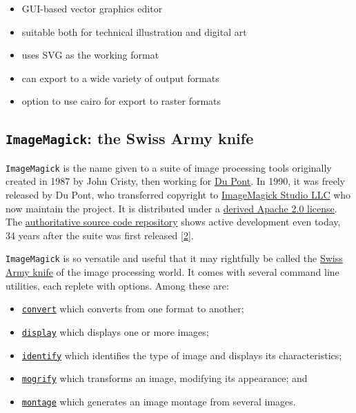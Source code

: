 \documentclass[
  12pt,
  british,
  a4paper,
  rgb,
  dvipsnames,
  svgnames,
  hyphens]{article}
\providecommand{\tightlist}{%
  \setlength{\itemsep}{0pt}\setlength{\parskip}{0pt}}
\begin{document}
\begin{enumerate}
  \begin{itemize}
  \tightlist
  \item
    GUI-based vector graphics editor
  \item
    suitable both for technical illustration and digital art
  \item
    uses SVG as the working format
  \item
    can export to a wide variety of output formats
  \item
    option to use cairo for export to raster formats
  \end{itemize}
\end{enumerate}

\hypertarget{imagemagick-the-swiss-army-knife}{%
\subsection{\texorpdfstring{\texttt{ImageMagick}: the Swiss Army
knife}{ImageMagick: the Swiss Army knife}}\label{imagemagick-the-swiss-army-knife}}

\texttt{ImageMagick} is the name given to a suite of image processing
tools originally created in 1987 by John Cristy, then working for
\href{https://www.dupont.com/}{Du Pont}. In 1990, it was freely released
by Du Pont, who transferred copyright to
\href{https://imagemagick.org/script/contact.php}{ImageMagick Studio
LLC} who now maintain the project. It is distributed under a
\href{https://imagemagick.org/script/license.php}{derived Apache 2.0
license}. The
\href{https://github.com/ImageMagick/ImageMagick}{authoritative source
code repository} shows active development even today, 34 years after the
suite was first released
\protect\hyperlink{ref-imagemagicksource}{{[}2{]}}.

\texttt{ImageMagick} is so versatile and useful that it may rightfully
be called the
\href{https://www.thefreedictionary.com/Swiss-army+knife}{Swiss Army
knife} of the image processing world. It comes with several command line
utilities, each replete with options. Among these are:

\begin{itemize}
\tightlist
\item
  \href{https://imagemagick.org/script/convert.php}{\texttt{convert}}
  which converts from one format to another;
\item
  \href{https://imagemagick.org/script/display.php}{\texttt{display}}
  which displays one or more images;
\item
  \href{https://imagemagick.org/script/identify.php}{\texttt{identify}}
  which identifies the type of image and displays its characteristics;
\item
  \href{https://imagemagick.org/script/mogrify.php}{\texttt{mogrify}}
  which transforms an image, modifying its appearance; and
\item
  \href{https://imagemagick.org/script/montage.php}{\texttt{montage}}
  which generates an image montage from several images.
\end{itemize}
\end{document}

